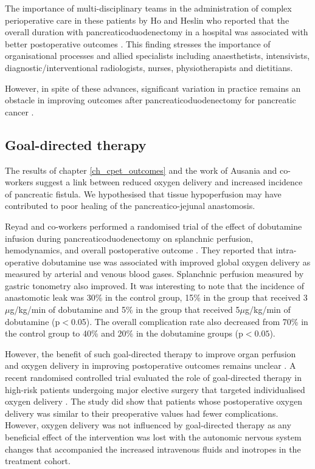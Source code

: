 The importance of multi-disciplinary teams in the administration of complex perioperative care in these patients by Ho and Heslin who reported that the overall duration with pancreaticoduodenectomy in a hospital was associated with better postoperative outcomes \parencite{ho_effect_2003}.
This finding stresses the importance of organisational processes and allied specialists including anaesthetists, intensivists, diagnostic/interventional radiologists, nurses, physiotherapists and dietitians.

However, in spite of these advances, significant variation in practice remains an obstacle in improving outcomes after pancreaticoduodenectomy for pancreatic cancer \parencite{cyr_canadian_2015}.

\subsection{Goal-directed therapy}

The results of chapter \ref{ch_cpet_outcomes} and the work of Ausania and co-workers \parencite{ausania_effects_2012} suggest a link between reduced oxygen delivery and increased incidence of pancreatic fistula. 
We hypothesised that tissue hypoperfusion may have contributed to poor healing of the pancreatico-jejunal anastomosis. 

Reyad and co-workers performed a randomised trial of the effect of dobutamine infusion during pancreaticoduodenectomy on splanchnic perfusion, hemodynamics, and overall postoperative outcome \parencite{reyad_effect_2013}. 
They reported that intra-operative dobutamine use was associated with improved global oxygen delivery as measured by arterial and venous blood gases. 
Splanchnic perfusion measured by gastric tonometry also improved.
It was interesting to note that the incidence of anastomotic leak was 30\% in the control group, 15\% in the group that received 3$\mu$g/kg/min of dobutamine and 5\% in the group that received 5$\mu$g/kg/min of dobutamine (p$<$0.05). 
The overall complication rate also decreased from 70\% in the control group to 40\% and 20\% in the dobutamine groups (p$<0.05$).

However, the benefit of such goal-directed therapy to improve organ perfusion and oxygen delivery in improving postoperative outcomes remains unclear \parencite{grocott_perioperative_2013, pearse_effect_2014}. 
A recent randomised controlled trial evaluated the role of goal-directed therapy in high-risk patients undergoing major elective surgery that targeted individualised oxygen delivery \parencite{ackland_individualised_2015}.
The study did show that patients whose postoperative oxygen delivery was similar to their preoperative values had fewer complications.
However, oxygen delivery was not influenced by goal-directed therapy as any beneficial effect of the intervention was lost with the autonomic nervous system changes that accompanied the increased intravenous fluids and inotropes in the treatment cohort.


